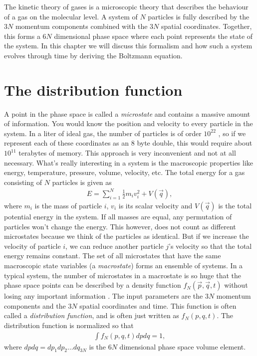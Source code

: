 The kinetic theory of gases is a microscopic theory that describes the behaviour of a gas on the molecular level. A system of $N$ particles is fully described by the $3N$ momentum components combined with the $3N$ spatial coordinates. Together, this forms a $6N$ dimensional phase space where each point represents the state of the system. In this chapter we will discuss this formalism and how such a system evolves through time by deriving the Boltzmann equation. 

\section{The distribution function}
A point in the phase space is called a \textit{microstate} and contains a massive amount of information. You would know the position and velocity to every particle in the system. In a liter of ideal gas, the number of particles is of order $10^{22}$ \cite{book:generell_fysikk_2}, so if we represent each of these coordinates as an 8 byte double, this would require about $10^11$ terabytes of memory. This approach is very inconvenient and not at all necessary. What's really interesting in a system is the macroscopic properties like energy, temperature, pressure, volume, velocity, etc. The total energy for a gas consisting of $N$ particles is given as
\begin{align*}
	E = \sum_{i=1}^N \frac{1}{2} m_i v_i^2 + V(\vec q),
\end{align*}
where $m_i$ is the mass of particle $i$, $v_i$ is its scalar velocity and $V(\vec q)$ is the total potential energy in the system. If all masses are equal, any permutation of particles won't change the energy. This however, does not count as different microstates because we think of the particles as identical. But if we increase the velocity of particle $i$, we can reduce another particle $j$'s velocity so that the total energy remains constant. The set of all microstates that have the same macroscopic state variables (a \textit{macrostate}) forms an ensemble of systems. In a typical system, the number of microstates in a macrostate is so huge that the phase space points can be described by a density function $f_N(\vec p, \vec q, t)$ without losing any important information \cite{book:statistical_mechanics_mc_quarrie}. The input parameters are the $3N$ momentum components and the $3N$ spatial coordinates and time. This function is often called a \textit{distribution function}, and is often just written as $f_N(p, q, t)$. The distribution function is normalized so that
\begin{align}
	\int f_N(p, q, t) dpdq = 1,
\end{align}
where $dpdq=dp_1dp_2...dq_{3N}$ is the $6N$ dimensional phase space volume element. 


